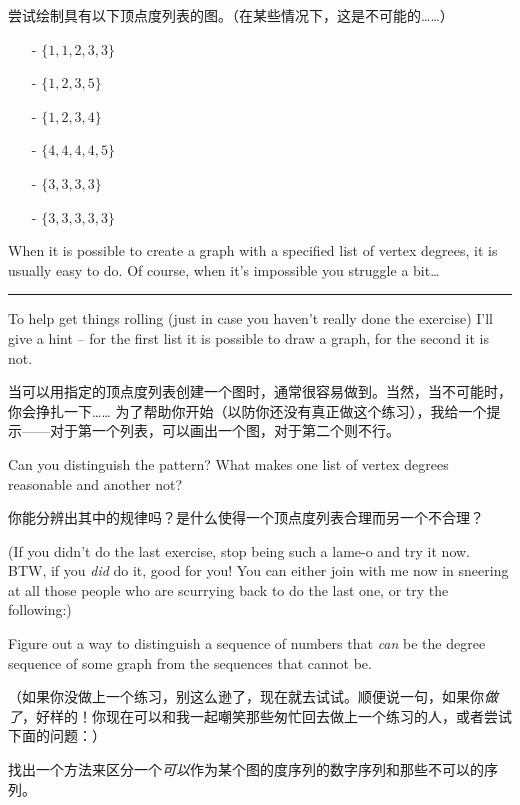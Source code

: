 \begin{exer}
尝试绘制具有以下顶点度列表的图。（在某些情况下，这是不可能的……）

\begin{itemize}
\item[-] $\{1,1,2,3,3\}$
\item[-] $\{1,2,3,5\}$
\item[-] $\{1,2,3,4\}$
\item[-] $\{4,4,4,4,5\}$
\item[-] $\{3,3,3,3\}$
\item[-] $\{3,3,3,3,3\}$
\end{itemize}
\end{exer} 
 
When it is possible to create a graph with a specified list
of vertex degrees, it is usually easy to do.  Of course, when 
it's impossible you struggle a bit\ldots \rule{5pt}{0pt} 
To help get things rolling (just in case you haven't
really done the exercise) I'll give a hint -- for the first list it 
is possible to draw a graph, for the second it is not.

当可以用指定的顶点度列表创建一个图时，通常很容易做到。当然，当不可能时，你会挣扎一下…… 为了帮助你开始（以防你还没有真正做这个练习），我给一个提示——对于第一个列表，可以画出一个图，对于第二个则不行。

Can you distinguish the pattern?  What makes one list
of vertex degrees reasonable and another not?

你能分辨出其中的规律吗？是什么使得一个顶点度列表合理而另一个不合理？

\begin{exer}
(If you didn't do the last exercise, stop being such a lame-o and 
try it now.  BTW, if you \emph{did} do it, good for you!  You can
either join with me now in sneering at all those people who are scurrying
back to do the last one, or try the following:)  

Figure out a way to distinguish a sequence of numbers that \emph{can} be
the degree sequence of some graph from the sequences that cannot be.
\end{exer}

\begin{exer}
（如果你没做上一个练习，别这么逊了，现在就去试试。顺便说一句，如果你\emph{做了}，好样的！你现在可以和我一起嘲笑那些匆忙回去做上一个练习的人，或者尝试下面的问题：）

找出一个方法来区分一个\emph{可以}作为某个图的度序列的数字序列和那些不可以的序列。
\end{exer}

